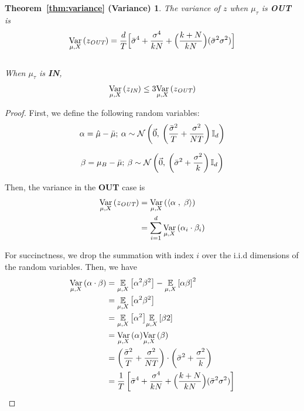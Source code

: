 \newtheorem*{vars}{Theorem~\ref{thm:variance} (Variance)}
\begin{vars}
    The variance of $z$ when $\mu_\tau$ is \textbf{OUT} is
    \[
        \var{\mu, X}{z_{\textit{OUT}}} = \frac{d}{T} \Big[ \bar{\sigma}^4 + \frac{\sigma^4}{kN} + \Big( \frac{k+N}{kN} \Big) ( \bar{\sigma}^2\sigma^2 ) \Big]
    \]
    \\
    When $\mu_\tau$ is \textbf{IN}, 
    \[
        \var{\mu,X}{{z}_{\textit{IN}}} \leq {3} \var{\mu,X}{{z}_{\textit{OUT}}}
    \]
\end{vars}

\begin{proof}
First, we define the following random variables:
\[
\alpha = \hat{\mu} - \bar{\mu}; \:
\alpha \sim \mathcal{N} \left( \vec{0}, \: \left( \frac{\bar{\sigma}^{2}}{T} + \frac{\sigma^{2}}{NT} \right) \mathbb{I}_d \right)
\]

\[
\beta = \mu_B - \bar{\mu}; \:
\beta \sim \mathcal{N} \left( \vec{0}, \: \left( \bar{\sigma}^{2} + \frac{\sigma^{2}}{k} \right) \mathbb{I}_d \right)
\]

Then, the variance in the \textbf{OUT} case is
\begin{align*}
    \var{\mu, X}{z_{\textit{OUT}}} &= \var{\mu, X}{\inn{\alpha}{\beta}} \\ 
    &= \sum_{i=1}^{d} \var{\mu, X}{\alpha_i \cdot\beta_i}
\end{align*}

For succinctness, we drop the summation with index $i$ over the i.i.d dimensions of the random variables. Then, we have
\begin{align*}
    \var{\mu, X}{\alpha \cdot \beta} &= \ex{\mu, X}{\alpha^{2} \beta^{2}} - \ex{\mu, X}{\alpha \beta}^{2} \\
    &= \ex{\mu, X}{\alpha^{2} \beta^{2}} \\ 
    &= \ex{\mu, X}{\alpha^{2}} \ex{\mu,X}{\beta{2}} \\ 
    &= \var{\mu, X}{\alpha} \var{\mu, X}{\beta} \\
    &= \left( \frac{\bar{\sigma}^{2}}{T} + \frac{\sigma^{2}}{NT} \right) \cdot \left( \bar{\sigma}^{2} + \frac{\sigma^{2}}{k} \right)  \\ 
    &= \frac{1}{T} \left[ \bar{\sigma}^4 + \frac{\sigma^4}{kN} + \Big( \frac{k+N}{kN} \Big) ( \bar{\sigma}^2\sigma^2 ) \right]
\end{align*}


\end{proof}
